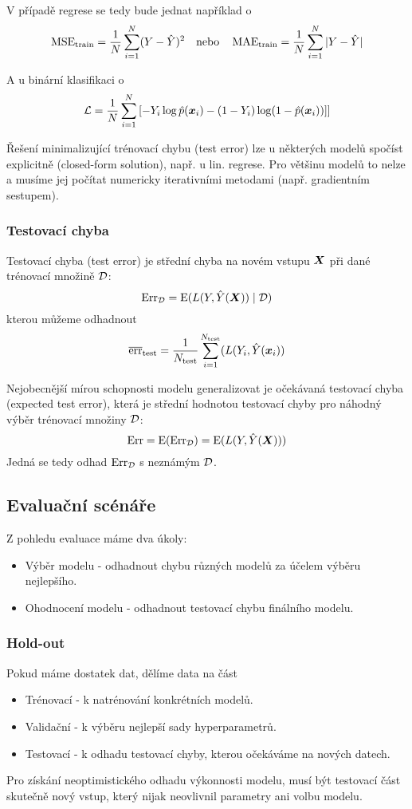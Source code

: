 \documentclass[../main.tex]{subfiles}
\begin{document}
V případě regrese se tedy bude jednat například o
\[
    \operatorname{MSE}_{\text{train}} = \frac{1}{N} \sum_{i=1}^{N} (Y - \hat{Y})^2
    \quad \text{nebo} \quad
    \operatorname{MAE}_{\text{train}} = \frac{1}{N} \sum_{i=1}^{N} |Y - \hat{Y}|
\]

A u binární klasifikaci o
\[
    \mathcal{L} = \frac{1}{N} \sum_{i=1}^{N}
    \left[
        - Y_i\log\hat{p}(\bm{x}_i) - (1-Y_i)\log(1-\hat{p}(\bm{x}_i))]
    \right]
\]

Řešení minimalizující trénovací chybu (test error) lze u některých modelů spočíst explicitně (closed-form solution), např. u lin. regrese. Pro většinu modelů to nelze a musíme jej počítat numericky iterativními metodami (např. gradientním sestupem).

\subsubsection{Testovací chyba}

Testovací chyba (test error) je střední chyba na novém vstupu $\bm{X}$ při dané trénovací množině $\mathcal{D}$:
\[
    \text{Err}_{\mathcal{D}} = \operatorname{E} (L(Y, \hat{Y}(\bm{X})) \mid \mathcal{D})
\]
kterou můžeme odhadnout
\[
    \overline{\text{err}}_{\text{test}} = \frac{1}{N_{\text{test}}} \sum_{i=1}^{N_{\text{test}}} (L(Y_i, \hat{Y}(\bm{x}_i))
\]

Nejobecnější mírou schopnosti modelu generalizovat je očekávaná testovací chyba (expected test error), která je střední hodnotou testovací chyby pro náhodný výběr trénovací množiny $\mathcal{D}$:
\[
    \text{Err} = \operatorname{E} (\text{Err}_{\mathcal{D}}) = \operatorname{E} (L(Y, \hat{Y}(\bm{X})))
\]
Jedná se tedy odhad $\text{Err}_{\mathcal{D}}$ s neznámým $\mathcal{D}$.

\subsection{Evaluační scénáře}

Z pohledu evaluace máme dva úkoly:
\begin{itemize}
    \item Výběr modelu - odhadnout chybu různých modelů za účelem výběru nejlepšího.
    \item Ohodnocení modelu - odhadnout testovací chybu finálního modelu.
\end{itemize}

\subsubsection{Hold-out}

Pokud máme dostatek dat, dělíme data na část
\begin{itemize}
    \item Trénovací - k natrénování konkrétních modelů.
    \item Validační - k výběru nejlepší sady hyperparametrů.
    \item Testovací - k odhadu testovací chyby, kterou očekáváme na nových datech.
\end{itemize}
Pro získání neoptimistického odhadu výkonnosti modelu, musí být testovací část skutečně nový vstup, který nijak neovlivnil parametry ani volbu modelu.
\end{document}
